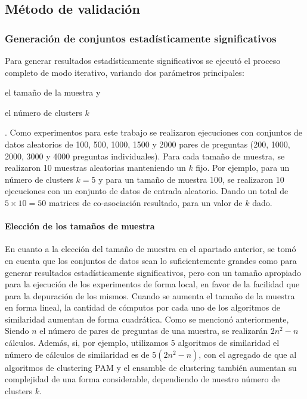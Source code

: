 \subsection{Método de validación}\label{metodo-validacion}

\subsubsection{Generación de conjuntos estadísticamente significativos}

Para generar resultados estadísticamente significativos se ejecutó el proceso completo de modo iterativo, variando dos parámetros principales: \begin{enumerate*} [label=(\roman*)] \item el tamaño de la muestra y \item el número de clusters \(k\)\end{enumerate*}. Como experimentos para este trabajo se realizaron ejecuciones con conjuntos de datos aleatorios de 100, 500, 1000, 1500 y 2000 pares de preguntas (200, 1000, 2000, 3000 y 4000 preguntas individuales). Para cada tamaño de muestra, se realizaron 10 muestras aleatorias manteniendo un \(k\) fijo. Por ejemplo, para un número de clusters \(k = 5\) y para un tamaño de muestra 100, se realizaron 10 ejecuciones con un conjunto de datos de entrada aleatorio. Dando un total de \(5 \times 10 = 50\) matrices de co-asociación resultado, para un valor de \(k\) dado.

\paragraph{Elección de los tamaños de muestra}
En cuanto a la elección del tamaño de muestra en el apartado anterior, se tomó en cuenta que los conjuntos de datos sean lo suficientemente grandes como para generar resultados estadísticamente significativos, pero con un tamaño apropiado para la ejecución de los experimentos de forma local, en favor de la facilidad que para la depuración de los mismos. Cuando se aumenta el tamaño de la muestra en forma lineal, la cantidad de cómputos por cada uno de los algoritmos de similaridad aumentan de forma cuadrática. Como se mencionó anteriormente, Siendo \(n\) el número de pares de preguntas de una muestra, se realizarán \(2n^2-n\) cálculos. Además, si, por ejemplo, utilizamos 5 algoritmos de similaridad el número de cálculos de similaridad es de \(5(2n^2-n)\), con el agregado de que al algoritmos de clustering PAM y el ensamble de clustering también aumentan su complejidad de una forma considerable, dependiendo de nuestro número de clusters \(k\).

